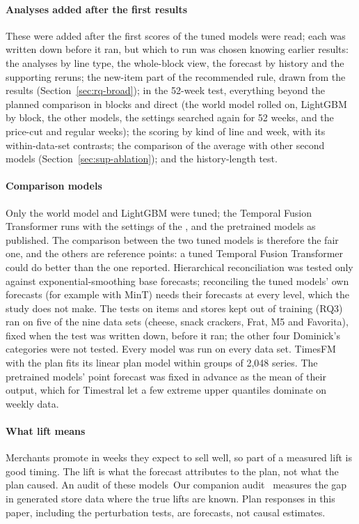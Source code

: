 \paragraph{Analyses added after the first results}
These were added after the first scores of the tuned models were read; each was
written down before it ran, but which to run was chosen knowing earlier results:
the analyses by line type, the whole-block view, the forecast by history and the
supporting reruns; the new-item part of the recommended rule, drawn from the
results (Section~\ref{sec:rq-broad}); in the 52-week test, everything beyond the
planned comparison in blocks and direct (the world model rolled on, LightGBM by
block, the other models, the settings searched again for 52 weeks, and the
price-cut and regular weeks); the scoring by kind of line and week, with its
within-data-set contrasts; the comparison of the average with other second
models (Section~\ref{sec:sup-ablation}); and the history-length test.

\paragraph{Comparison models}
Only the world model and LightGBM were tuned; the Temporal Fusion Transformer
runs with the settings of the \firstver{}, and the pretrained models as
published. The comparison between the two tuned models is therefore the fair one,
and the others are reference points: a tuned Temporal Fusion Transformer could do
better than the one reported. Hierarchical reconciliation was tested only against
exponential-smoothing base forecasts; reconciling the tuned models' own forecasts
(for example with MinT) needs their forecasts at every level, which the study does
not make. The tests on items and stores kept out of training (RQ3) ran on five of
the nine data sets (cheese, snack crackers, Frat, M5 and Favorita), fixed when the
test was written down, before it ran; the other four Dominick's categories were
not tested. Every model was run on every data set.
TimesFM with the
plan fits its linear plan model within groups of 2,048 series. The pretrained
models' point forecast was fixed in advance as the mean of their output, which
for Timestral let a few extreme upper quantiles dominate on weekly data.

\paragraph{What lift means}
Merchants promote in weeks they expect to sell well, so part of a measured lift
is good timing. The lift is what the forecast attributes to the plan, not what
the plan caused. \ifjournal An audit of these models~\cite{paper2}\else Our companion audit~\cite{paper2}\fi{} measures the gap in generated store
data where the true lifts are known. Plan responses in this paper, including the
perturbation tests, are forecasts, not causal estimates.

